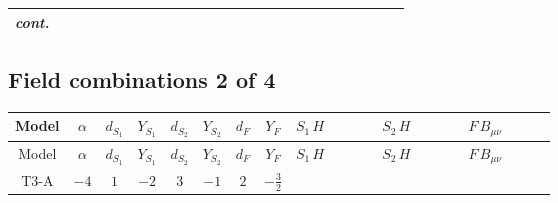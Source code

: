\documentclass[8pt]{article}
\begin{document}
\begin{landscape}
\begin{longtable}{@{}cccccccc >{\raggedright\arraybackslash}p{0.21\linewidth} >{\raggedright\arraybackslash}p{0.21\linewidth} >{\raggedright\arraybackslash}p{0.21\linewidth}@{}}
\textit{cont.} &  &  &  &  &  &  &  & \scriptsize\adjustbox{max width=\linewidth}{$\begin{gathered} -\frac{2 \hbar  \log \left(\frac{\bar{\mu}^{2}}{m_2^2}\right) \overline{\lambda_5} H_{a_1} H_{a_2} m_2^2 \lambda_5 H_{a_1}{}^{\dagger } H_{a_2}{}^{\dagger }}{\sqrt{3} \left(m_1^2-m_2^2\right)} \\ +\hbar  C_{\text{H2}} H_{a_2} H_{a_1}{}^{\dagger } \mathcal{I}_{H1,a_1,a_2}{}^1\end{gathered}$} &  &  \\
\midrule
\bottomrule
\end{longtable}
\clearpage
\subsection*{Field combinations 2 of 4}
\begin{longtable}{@{}cccccccc >{\raggedright\arraybackslash}p{0.21\linewidth} >{\raggedright\arraybackslash}p{0.21\linewidth} >{\raggedright\arraybackslash}p{0.21\linewidth}@{}}
\toprule
Model & $\alpha$ & $d_{S_1}$ & $Y_{S_1}$ & $d_{S_2}$ & $Y_{S_2}$ & $d_F$ & $Y_F$ & $S_1\,H$ & $S_2\,H$ & $F\,B_{\mu\nu}$ \\
\midrule
\endfirsthead
\toprule
Model & $\alpha$ & $d_{S_1}$ & $Y_{S_1}$ & $d_{S_2}$ & $Y_{S_2}$ & $d_F$ & $Y_F$ & $S_1\,H$ & $S_2\,H$ & $F\,B_{\mu\nu}$ \\
\midrule
\endhead
T3-A & $-4$ & $1$ & $-2$ & $3$ & $-1$ & $2$ & $-\frac{3}{2}$ & \scriptsize\adjustbox{max width=\linewidth}{$\begin{gathered} +\frac{\hbar  H_{a_3} H_{a_4} H_{a_1}{}^{\dagger } H_{a_2}{}^{\dagger } \mathcal{I}_{H1,a_1,a_3}{}^1 \mathcal{I}_{H1,a_2,a_4}{}^1 \left(\lambda_{HS_1}^{(1)}^{(1)}\right){}^2}{2 \epsilon } \\ +\frac{1}{2} \hbar  \log \left(\frac{\bar{\mu}^{2}}{m_1^2}\right) H_{a_3} H_{a_4} H_{a_1}{}^{\dagger } H_{a_2}{}^{\dagger } \mathcal{I}_{H1,a_1,a_3}{}^1 \mathcal{I}_{H1,a_2,a_4}{}^1 \left(\lambda_{HS_1}^{(1)}^{(1)}\right){}^2\end{gathered}$} & \scriptsize\adjustbox{max width=\linewidth}{$\begin{gathered} +\frac{3 \hbar  H_{a_1} H_{a_2} H_{a_1}{}^{\dagger } H_{a_2}{}^{\dagger } \left(\lambda_{HS_2}^{(1)}^{(2)}\right){}^2}{2 \epsilon } \\ +\frac{3}{2} \hbar  \log \left(\frac{\bar{\mu}^{2}}{m_2^2}\right) H_{a_1} H_{a_2} H_{a_1}{}^{\dagger } H_{a_2}{}^{\dagger } \left(\lambda_{HS_2}^{(1)}^{(2)}\right){}^2\end{gathered}$} & \scriptsize\adjustbox{max width=\linewidth}{$\begin{gathered} -\frac{9}{2} \hbar  \log \left(\frac{\bar{\mu}^{2}}{M_F^2}\right) B_{\mu _1\mu _2}^2\end{gathered}$} \\
\midrule
\bottomrule
\end{longtable}
\clearpage

\end{landscape}
\end{document}
